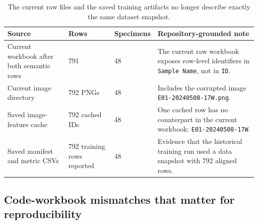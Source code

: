\documentclass[11pt]{article}
\begin{document}
\begin{table}[H]
\centering
\small
\begin{tabularx}{\textwidth}{p{} p{} p{} Y}
\toprule
\textbf{Source} & \textbf{Rows} & \textbf{Specimens} & \textbf{Repository-grounded note} \\
\midrule
Current workbook after both semantic rows & 791 & 48 & The current raw workbook exposes row-level identifiers in \texttt{Sample Name}, not in \texttt{ID}. \\
Current image directory & 792 PNGs & 48 & Includes the corrupted image \texttt{E01-20240508-17W.png}. \\
Saved image-feature cache & 792 cached IDs & 48 & One cached row has no counterpart in the current workbook: \texttt{E01-20240508-17W}. \\
Saved manifest and metric CSVs & 792 training rows reported & 48 & Evidence that the historical training run used a data snapshot with 792 aligned rows. \\
\bottomrule
\end{tabularx}
\caption{The current raw files and the saved training artifacts no longer describe exactly the same dataset snapshot.}
\label{tab:raw_vs_artifact}
\end{table}

\subsection{Code-workbook mismatches that matter for reproducibility}
\end{document}
